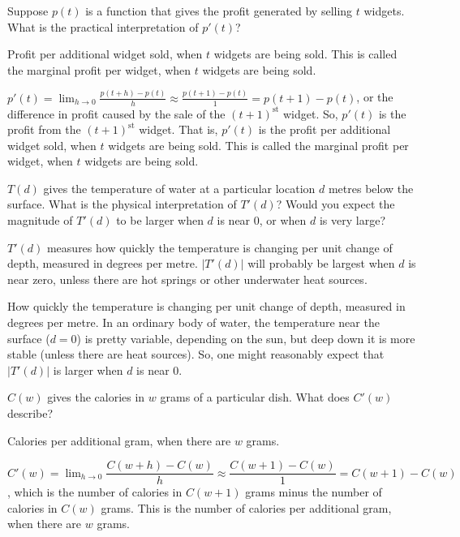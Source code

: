 \begin{question}Suppose $p(t)$ is a function that gives the profit generated by selling $t$ widgets. What is the practical interpretation of $p'(t)$?
\end{question}
\begin{answer} Profit per additional widget sold, when $t$ widgets are being sold. This is called the marginal profit per widget, when $t$ widgets are being sold.
\end{answer}
\begin{solution}
$p'(t) = \displaystyle\lim_{h \rightarrow 0}\frac{p(t+h)-p(t)}{h} \approx \frac{p(t+1)-p(t)}{1} = p(t+1)-p(t)$, or the difference in profit caused by the sale of the $(t+1)^{\mathrm{st}}$ widget. So, $p'(t)$ is the profit from the $(t+1)^{\mathrm{st}}$ widget. That is, $p'(t)$ is the profit per additional widget sold, when $t$ widgets are being sold. This is called the marginal profit per widget, when $t$ widgets are being sold.
\end{solution}

\begin{question} $T(d)$ gives the temperature of water at a particular location $d$ metres below the surface. What is the physical interpretation of $T'(d)$? Would you expect the magnitude of $T'(d)$ to be larger when $d$ is near 0, or when $d$ is very large?
\end{question}
\begin{answer} $T'(d)$ measures how quickly the temperature is changing per unit change of depth, measured in degrees per metre. $|T'(d)|$ will probably be largest when $d$ is near zero, unless there are hot springs or other underwater heat sources.
\end{answer}
\begin{solution} How quickly the temperature is changing per unit change of depth, measured in degrees per metre. In an ordinary body of water, the temperature near the surface ($d=0$) is pretty variable, depending on the sun, but deep down it is more stable (unless there are heat sources). So, one might reasonably expect that $|T'(d)|$ is larger when $d$ is near 0.
\end{solution}

\begin{question}$C(w)$ gives the calories in $w$ grams of a particular dish. What does $C'(w)$ describe?
\end{question}
\begin{answer} Calories per additional gram, when there are $w$ grams.
\end{answer}
\begin{solution} $C'(w)=\displaystyle\lim_{h \rightarrow 0} \dfrac{C(w+h)-C(w)}{h} \approx \dfrac{C(w+1)-C(w)}{1}=C(w+1)-C(w)$, which is the number of calories in $C(w+1)$ grams minus the number of calories in $C(w)$ grams. This is the number of calories per additional gram, when there are $w$ grams.
\end{solution}

